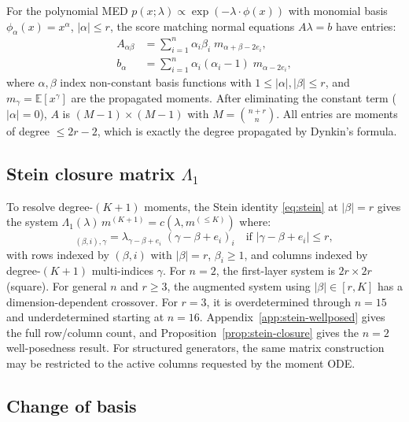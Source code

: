 \documentclass{article}
\newcommand{\E}{\mathbb{E}}
\theoremstyle{definition}
\begin{document}
For the polynomial MED $p(x;\lambda) \propto \exp(-\lambda\cdot\phi(x))$
with monomial basis $\phi_\alpha(x) = x^\alpha$, $|\alpha| \le r$,
the score matching normal equations $A\lambda = b$ have entries:
\begin{align}
    A_{\alpha\beta} &=
    \sum_{i=1}^n \alpha_i \beta_i\; m_{\alpha+\beta-2e_i}, \label{eq:A-entry}\\
    b_\alpha &= \sum_{i=1}^n \alpha_i (\alpha_i - 1)\; m_{\alpha-2e_i},
    \label{eq:b-entry}
\end{align}
where $\alpha,\beta$ index non-constant basis functions with
$1 \le |\alpha|,|\beta| \le r$, and $m_\gamma = \E[x^\gamma]$
are the propagated moments.
After eliminating the constant term ($|\alpha| = 0$),
$A$ is $(M{-}1) \times (M{-}1)$ with $M = \binom{n+r}{n}$.
All entries are moments of degree $\le 2r - 2$, which is
exactly the degree propagated by Dynkin's formula.

\subsection{Stein closure matrix \texorpdfstring{$\Lambda_1$}{Lambda-1}}

To resolve degree-$(K{+}1)$ moments, the Stein identity
\eqref{eq:stein} at $|\beta| = r$ gives the system
$\Lambda_1(\lambda)\, m^{(K+1)} = c(\lambda, m^{(\le K)})$ where:
\begin{equation}
    [\Lambda_1]_{(\beta,i),\gamma} =
    \lambda_{\gamma - \beta + e_i}\; (\gamma - \beta + e_i)_i
    \quad\text{if } |\gamma - \beta + e_i| \le r,
\end{equation}
with rows indexed by $(\beta, i)$ with $|\beta| = r$, $\beta_i \ge 1$,
and columns indexed by degree-$(K{+}1)$ multi-indices $\gamma$.
For $n = 2$, the first-layer system is $2r \times 2r$ (square).
For general $n$ and $r \ge 3$, the augmented system using
$|\beta| \in [r, K]$ has a dimension-dependent crossover.
For $r{=}3$, it is overdetermined through $n{=}15$ and
underdetermined starting at $n{=}16$.
Appendix~\ref{app:stein-wellposed} gives the full row/column count,
and Proposition~\ref{prop:stein-closure} gives the $n{=}2$
well-posedness result. For structured generators, the same matrix
construction may be restricted to the active columns requested by the
moment ODE.

\subsection{Change of basis}
\label{app:basis-change}
\end{document}

